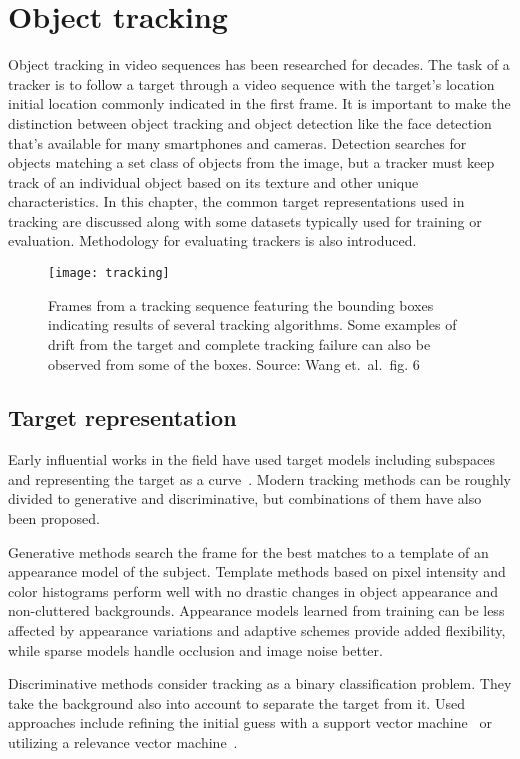\section{Object tracking}
Object tracking in video sequences has been researched for decades. The task of a
tracker is to follow a target through a video sequence with the target's location
initial location commonly indicated in the first frame. It is important to make the
distinction between object tracking and object detection like the face detection that's
available for many smartphones and cameras. Detection searches for objects matching
a set class of objects from the image, but a tracker must keep track of an individual
object based on its texture and other unique characteristics. In this chapter, the
common target representations used in tracking are discussed along with some datasets
typically used for training or evaluation. Methodology for evaluating trackers is also
introduced.

\begin{figure}[H]
\centering
\texttt{[image: tracking]}
\caption{Frames from a tracking sequence featuring the bounding boxes indicating results
         of several tracking algorithms. Some examples of drift from the target and
         complete tracking failure can also be observed from some of the boxes.
         Source: Wang et.~al.~fig. 6~\cite{OBJECT_PLS}}\label{fig:tracking}
\end{figure}

\subsection{Target representation}
Early influential works in the field have used target models including subspaces
~\cite{EIGENTRACK} and representing the target as a curve~\cite{CONDENSATION}. Modern
tracking methods can be roughly divided to generative and discriminative, but combinations
of them have also been proposed.~\cite{DLT}

Generative methods search the frame for the best matches to a template of an appearance
model of the subject. Template methods based on pixel intensity and color histograms
perform well with no drastic changes in object appearance and non-cluttered backgrounds.
Appearance models learned from training can be less affected by appearance variations
and adaptive schemes provide added flexibility, while sparse models handle occlusion
and image noise better.~\cite{OBJECT_PLS}

Discriminative methods consider tracking as a binary classification problem. They take
the background also into account to separate the target from it. Used approaches
include refining the initial guess with a support vector machine~\cite{SVT} or utilizing
a relevance vector machine~\cite{SPARSE_BAYESIAN}.

